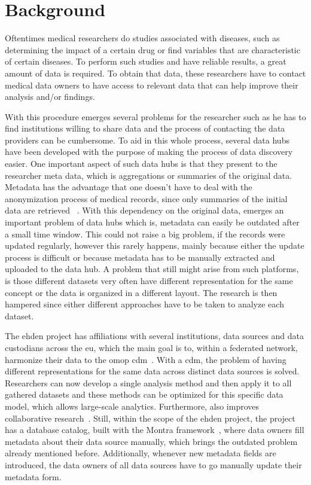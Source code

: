 \chapter{Background}
\label{chapter:background}

Oftentimes medical researchers do studies associated with diseases, such as determining the impact of a certain drug or find variables that are characteristic of certain diseases.
To perform such studies and have reliable results, a great amount of data is required.
To obtain that data, these researchers have to contact medical data owners to have access to relevant data that can help improve their analysis and/or findings.

With this procedure emerges several problems for the researcher such as he has to find
institutions willing to share data and the process of contacting the data providers can
be cumbersome.
To aid in this whole process, several data hubs have been developed with the purpose of
making the process of data discovery easier.
One important aspect of such data hubs is that they present to the researcher meta
data, which is aggregations or summaries of the original data.
Metadata has the advantage that one doesn't have to deal with the anonymization process
of medical records, since only summaries of the initial data are retrieved
~\cite{egenvar, montra}.
With this dependency on the original data, emerges an important problem of data hubs
which is, metadata can easily be outdated after a small time window.
This could not raise a big problem, if the records were updated regularly, however this
rarely happens, mainly because either the update process is difficult or because
metadata has to be manually extracted and uploaded to the data hub.
A problem that still might arise from such platforms, is those different datasets very
often have different representation for the same concept or the data is organized in a
different layout.
The research is then hampered since either different approaches have to be taken to
analyze each dataset.

The \gls{ehden} project has affiliations with several institutions, data sources and
data custodians across the \gls{eu}, which the main goal is to, within a federated
network, harmonize their data to the \gls{omop} \gls{cdm}~\cite{ehden-datapartners}.
With a \gls{cdm}, the problem of having different representations for the same data
across distinct data sources is solved.
Researchers can now develop a single analysis method and then apply it to all gathered
datasets and these methods can be optimized for this specific data model, which allows
large-scale analytics.
Furthermore, also improves collaborative research~\cite{ohdsi-site}.
Still, within the scope of the \gls{ehden} project, the project has a database catalog,
built with the Montra framework~\cite{montra}, where data owners fill metadata about
their data source manually, which brings the outdated problem already mentioned before.
Additionally, whenever new metadata fields are introduced, the data owners of all data
sources have to go manually update their metadata form.

